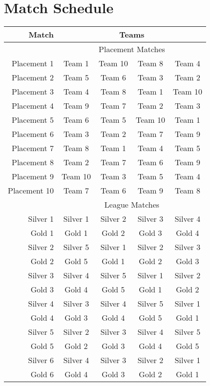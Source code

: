 \section{Match Schedule}
\label{apx:matches}

\begin{tabular}{r | c c c c}
    Match & \multicolumn{4}{|c}{Teams} \\
    \hline
    & \multicolumn{4}{|c}{Placement Matches} \\
    Placement 1 & Team 1 & Team 10 & Team 8 & Team 4 \\
    Placement 2 & Team 5 & Team 6 & Team 3 & Team 2 \\
    Placement 3 & Team 4 & Team 8 & Team 1 & Team 10 \\
    Placement 4 & Team 9 & Team 7 & Team 2 & Team 3 \\
    Placement 5 & Team 6 & Team 5 & Team 10 & Team 1 \\
    Placement 6 & Team 3 & Team 2 & Team 7 & Team 9 \\
    Placement 7 & Team 8 & Team 1 & Team 4 & Team 5 \\
    Placement 8 & Team 2 & Team 7 & Team 6 & Team 9 \\
    Placement 9 & Team 10 & Team 3 & Team 5 & Team 4 \\
    Placement 10 & Team 7 & Team 6 & Team 9 & Team 8 \\
    & \multicolumn{4}{|c}{League Matches} \\
    Silver 1 & Silver 1 & Silver 2 & Silver 3 & Silver 4 \\
    Gold 1 & Gold 1 & Gold 2 & Gold 3 & Gold 4 \\
    Silver 2 & Silver 5 & Silver 1 & Silver 2 & Silver 3 \\
    Gold 2 & Gold 5 & Gold 1 & Gold 2 & Gold 3 \\
    Silver 3 & Silver 4 & Silver 5 & Silver 1 & Silver 2 \\
    Gold 3 & Gold 4 & Gold 5 & Gold 1 & Gold 2 \\
    Silver 4 & Silver 3 & Silver 4 & Silver 5 & Silver 1 \\
    Gold 4 & Gold 3 & Gold 4 & Gold 5 & Gold 1 \\
    Silver 5 & Silver 2 & Silver 3 & Silver 4 & Silver 5 \\
    Gold 5 & Gold 2 & Gold 3 & Gold 4 & Gold 5 \\
    Silver 6 & Silver 4 & Silver 3 & Silver 2 & Silver 1 \\
    Gold 6 & Gold 4 & Gold 3 & Gold 2 & Gold 1 \\

\end{tabular}
